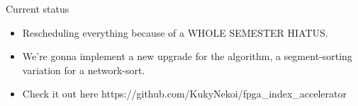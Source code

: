 \documentclass{beamer}
\begin{document}
\begin{frame}
	Current status
	\begin{itemize}
		\item Rescheduling everything because of a WHOLE SEMESTER HIATUS.
		\item We're gonna implement a new upgrade for the algorithm, a segment-sorting variation for a network-sort.
		\item Check it out here https://github.com/KukyNekoi/fpga_index_accelerator
	\end{itemize}
  \end{frame}
\end{document}
